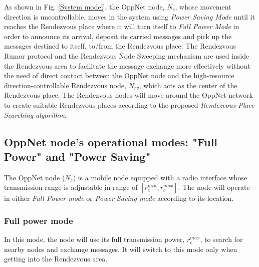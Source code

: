 As shown in Fig. \ref{System model}, the OppNet node, $N_{c}$, whose movement direction is uncontrollable, moves in the system using \textit{Power Saving Mode}  until it reaches the Rendezvous place where it will turn itself to \emph{Full Power Mode} in order to announce its arrival, deposit its carried messages and pick up the messages destined to itself, to/from the Rendezvous place.
The Rendezvous Rumor protocol and the Rendezvous Node Sweeping mechanism are used inside the Rendezvous area to facilitate the message exchange more effectively without the need of direct contact between the OppNet node and the high-resource direction-controllable Rendezvous node, $N_{rv}$, which acts as the center of the Rendezvous place.
The Rendezvous nodes will move around the OppNet network to create suitable Rendezvous places according to the proposed \emph{Rendezvous Place Searching algorithm}.

\subsection{OppNet node's operational modes: "Full Power" and "Power Saving"}
The OppNet node ($N_{c}$) is a mobile node equipped with a radio interface whose transmission range is adjustable in range of $[{ r }_{ c }^{ min },{ r }_{ c }^{ max }]$.
The node will operate in either \emph{Full Power mode} or \emph{Power Saving mode} according to its location.

\subsubsection{Full power mode}

In this mode, the node will use its full transmission power, ${ r }_{ c }^{ max }$, to search for nearby nodes and exchange messages.
%
It will switch to this mode only when getting into the Rendezvous area.

